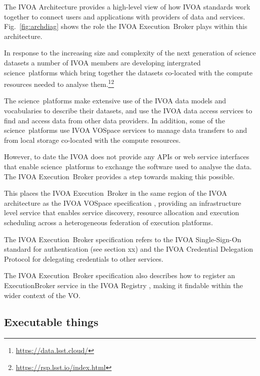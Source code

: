 \documentclass[11pt,a4paper]{ivoa}
\newcommand{\webservice} {web service}
\newcommand{\ivoa} {IVOA}
\newcommand{\vospace} {VOSpace}
\newcommand{\execbrokerclass} {ExecutionBroker}
\newcommand{\executionbroker} {Execution~Broker}
\newcommand{\footurl}[1] {\footnote{\url{#1}}}
\newcommand{\dataset}[1] {dataset#1}
\newcommand{\scienceplatform}[1] {science~platform#1}
\begin{document}
The IVOA Architecture\citep{2010ivoa.rept.1123A} provides a high-level view of how IVOA
standards work together to connect users and applications with providers of data
and services.
Fig.~\ref{fig:archdiag} shows the role the \ivoa{} \executionbroker{} plays within this architecture.

In response to the increasing size and complexity of the next generation of science \dataset{s}
a number of \ivoa{} members are developing intergrated \scienceplatform{s} which bring
together the \dataset{s} co-located with the compute resources needed to analyse
them.\footurl{https://data.lsst.cloud/}\footurl{https://rsp.lsst.io/index.html}

The \scienceplatform{s} make extensive use of the \ivoa{} data models and
vocabularies to describe their \dataset{s}, and use the \ivoa{} data access
services to find and access data from other data providers.
In addition, some of the \scienceplatform{s} use \ivoa{} \vospace{} services to manage
data transfers to and from local storage co-located with the compute resources.

However, to date the \ivoa{} does not provide any APIs or \webservice{} interfaces that
enable \scienceplatform{s} to exchange the software used to analyse the data.
The \ivoa{} \executionbroker{} provides a step towards making this possible.

This places the \ivoa{} \executionbroker{} in the same region of the \ivoa{} architecture
as the \ivoa{} \vospace{} specification \citep{2009ivoa.specQ1007G},
providing an infrastructure level service that enables service discovery,
resource allocation and execution scheduling across a heterogeneous federation
of execution platforms.

The \ivoa{} \executionbroker{} specification refers to the
\ivoa{} Single-Sign-On standard \citep{2017ivoa.spec.0524T}
for authentication (see section xx) %
and the
\ivoa{} Credential Delegation Protocol \citep{2010ivoa.spec.0218P}
for delegating credentials to other services.

The \ivoa{} \executionbroker{} specification also describes how to register
an \execbrokerclass{} service in the
\ivoa{} Registry \citep{2009ivoa.spec.1104B},
making it findable within the wider context of the VO.

\subsection{Executable things}
\label{executablething}
\end{document}
